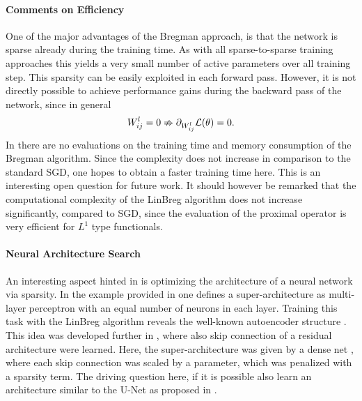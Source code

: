 \paragraph{Comments on Efficiency} One of the major advantages of the Bregman approach, is that the network is sparse already during the training time. As with all sparse-to-sparse training approaches this yields a very small number of active parameters over all training step. This sparsity can be easily exploited in each forward pass. However, it is not directly possible to achieve performance gains during the backward pass of the network, since in general
%
\begin{align*}
W^l_{ij} = 0 \nRightarrow \partial_{W^l_{ij}} \mathcal{L}(\theta) = 0.
\end{align*}
%
In \cite{bungert2022bregman, bungert2021neural} there are no evaluations on the training time and memory consumption of the Bregman algorithm. Since the complexity does not increase in comparison to the standard SGD, one hopes to obtain a faster training time here. This is an interesting open question for future work. It should however be remarked that the computational complexity of the LinBreg algorithm does not increase significantly, compared to SGD, since the evaluation of the proximal operator is very efficient for $L^1$ type functionals.

\paragraph{Neural Architecture Search} An interesting aspect hinted in \cite{bungert2022bregman} is optimizing the architecture of a neural network via sparsity. In the example provided in \cite[Fig. 4]{bungert2022bregman} one defines a super-architecture as multi-layer perceptron with an equal number of neurons in each layer. Training this task with the LinBreg algorithm reveals the well-known autoencoder structure \cite{hinton1993autoencoders}. This idea was developed further in \cite{bungert2021neural}, where also skip connection of a residual architecture were learned. Here, the super-architecture was given by a dense net \cite{huang2017densely}, where each skip connection was scaled by a parameter, which was penalized with a sparsity term. The driving question here, if it is possible also learn an architecture similar to the U-Net as proposed in \cite{ronneberger2015u}.
%
%
%
%
\clearpage%
%
